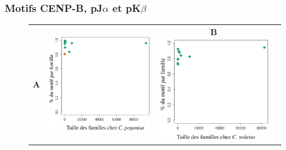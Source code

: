 \documentclass[12pt,a4paper]{article}
\begin{document}
			\subsubsection{Motifs CENP-B, pJ$\alpha$ et pK$\beta$}
\begin{figure}	
	\begin{tabular}{cccc} 
		\textbf{A} & \includegraphics[scale=0.3]{img/motif_pogonias.png} & \textbf{B} \includegraphics[scale=0.3]{img/motif_solatus.png} \\

\end{tabular}
\end{figure}
\end{document}
